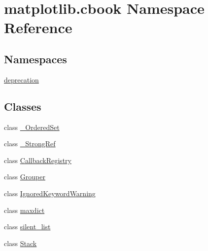 \hypertarget{namespacematplotlib_1_1cbook}{}\section{matplotlib.\+cbook Namespace Reference}
\label{namespacematplotlib_1_1cbook}
\subsection*{Namespaces}
\begin{DoxyCompactItemize}
\item 
 \hyperlink{namespacematplotlib_1_1cbook_1_1deprecation}{deprecation}
\end{DoxyCompactItemize}
\subsection*{Classes}
\begin{DoxyCompactItemize}
\item 
class \hyperlink{classmatplotlib_1_1cbook_1_1__OrderedSet}{\+\_\+\+Ordered\+Set}
\item 
class \hyperlink{classmatplotlib_1_1cbook_1_1__StrongRef}{\+\_\+\+Strong\+Ref}
\item 
class \hyperlink{classmatplotlib_1_1cbook_1_1CallbackRegistry}{Callback\+Registry}
\item 
class \hyperlink{classmatplotlib_1_1cbook_1_1Grouper}{Grouper}
\item 
class \hyperlink{classmatplotlib_1_1cbook_1_1IgnoredKeywordWarning}{Ignored\+Keyword\+Warning}
\item 
class \hyperlink{classmatplotlib_1_1cbook_1_1maxdict}{maxdict}
\item 
class \hyperlink{classmatplotlib_1_1cbook_1_1silent__list}{silent\+\_\+list}
\item 
class \hyperlink{classmatplotlib_1_1cbook_1_1Stack}{Stack}
\end{DoxyCompactItemize}
